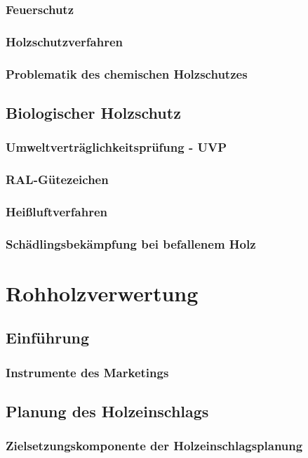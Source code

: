 \documentclass{article}
\begin{document}
\subsubsection{Feuerschutz}
\subsubsection{Holzschutzverfahren}
\subsubsection{Problematik des chemischen Holzschutzes}
\subsection{Biologischer Holzschutz}
\subsubsection{Umweltverträglichkeitsprüfung - UVP}
\subsubsection{RAL-Gütezeichen}
\subsubsection{Heißluftverfahren}
\subsubsection{Schädlingsbekämpfung bei befallenem Holz}
\section{Rohholzverwertung}
\subsection{Einführung}
\subsubsection{Instrumente des Marketings}
\subsection{Planung des Holzeinschlags}
\subsubsection{Zielsetzungskomponente der Holzeinschlagsplanung}
\end{document}
